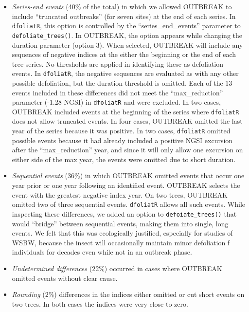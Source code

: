 \documentclass[review]{elsarticle} %
\begin{document}
\begin{itemize}
\item
  \emph{Series-end events} (40\% of the total) in which we allowed OUTBREAK to include ``truncated outbreaks'' (for seven sites) at the end of each series. In \texttt{dfoliatR}, this option is controlled by the ``series\_end\_events'' parameter to \texttt{defoliate\_trees()}. In OUTBREAK, the option appears while changing the duration parameter (option 3). When selected, OUTBREAK will include any sequences of negative indices at the either the beginning or the end of each tree series. No thresholds are applied in identifying these as defoliation events. In \texttt{dfoliatR}, the negative sequences are evaluated as with any other possible defoliation, but the duration threshold is omitted. Each of the 13 events included in these differences did not meet the ``max\_reduction'' parameter (-1.28 NGSI) in \texttt{dfoliatR} and were excluded. In two cases, OUTBREAK included events at the beginning of the series where \texttt{dfoliatR} does not allow truncated events. In four cases, OUTBREAK omitted the last year of the series because it was positive. In two cases, \texttt{dfoliatR} omitted possible events because it had already included a positive NGSI excursion after the ``max\_reduction'' year, and since it will only allow one excursion on either side of the max year, the events were omitted due to short duration.
\item
  \emph{Sequential events} (36\%) in which OUTBREAK omitted events that occur one year prior or one year following an identified event. OUTBREAK selects the event with the greatest negative index year. On two trees, OUTBREAK omitted two of three sequential events. \texttt{dfoliatR} allows all such events. While inspecting these differences, we added an option to \texttt{defoiate\_trees()} that would ``bridge'' between sequential events, making them into single, long events. We felt that this was ecologically justified, especially for studies of WSBW, because the insect will occasionally maintain minor defoliation f individuals for decades even while not in an outbreak phase.
\item
  \emph{Undetermined differences} (22\%) occurred in cases where OUTBREAK omitted events without clear cause.
\item
  \emph{Rounding} (2\%) differences in the indices either omitted or cut short events on two trees. In both cases the indices were very close to zero.
\end{itemize}
\end{document}
